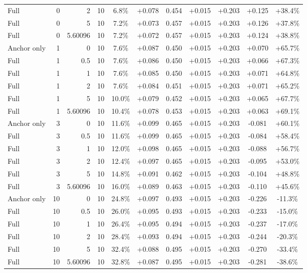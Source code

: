 \begin{table}[htbp]
\begin{tabular}{lrrrccccccc}
Full & 0 & 2 & 10 & 6.8\% & +0.078 & 0.454 & +0.015 & +0.203 & +0.125 & +38.4\% \\
Full & 0 & 5 & 10 & 7.2\% & +0.073 & 0.457 & +0.015 & +0.203 & +0.126 & +37.8\% \\
Full & 0 & 5.60096 & 10 & 7.2\% & +0.072 & 0.457 & +0.015 & +0.203 & +0.124 & +38.8\% \\
Anchor only & 1 & 0 & 10 & 7.6\% & +0.087 & 0.450 & +0.015 & +0.203 & +0.070 & +65.7\% \\
Full & 1 & 0.5 & 10 & 7.6\% & +0.086 & 0.450 & +0.015 & +0.203 & +0.066 & +67.3\% \\
Full & 1 & 1 & 10 & 7.6\% & +0.085 & 0.450 & +0.015 & +0.203 & +0.071 & +64.8\% \\
Full & 1 & 2 & 10 & 7.6\% & +0.084 & 0.451 & +0.015 & +0.203 & +0.071 & +65.2\% \\
Full & 1 & 5 & 10 & 10.0\% & +0.079 & 0.452 & +0.015 & +0.203 & +0.065 & +67.7\% \\
Full & 1 & 5.60096 & 10 & 10.4\% & +0.078 & 0.453 & +0.015 & +0.203 & +0.063 & +69.1\% \\
Anchor only & 3 & 0 & 10 & 11.6\% & +0.099 & 0.465 & +0.015 & +0.203 & -0.081 & +60.1\% \\
Full & 3 & 0.5 & 10 & 11.6\% & +0.099 & 0.465 & +0.015 & +0.203 & -0.084 & +58.4\% \\
Full & 3 & 1 & 10 & 12.0\% & +0.098 & 0.465 & +0.015 & +0.203 & -0.088 & +56.7\% \\
Full & 3 & 2 & 10 & 12.4\% & +0.097 & 0.465 & +0.015 & +0.203 & -0.095 & +53.0\% \\
Full & 3 & 5 & 10 & 14.8\% & +0.091 & 0.462 & +0.015 & +0.203 & -0.104 & +48.8\% \\
Full & 3 & 5.60096 & 10 & 16.0\% & +0.089 & 0.463 & +0.015 & +0.203 & -0.110 & +45.6\% \\
Anchor only & 10 & 0 & 10 & 24.8\% & +0.097 & 0.493 & +0.015 & +0.203 & -0.226 & -11.3\% \\
Full & 10 & 0.5 & 10 & 26.0\% & +0.095 & 0.493 & +0.015 & +0.203 & -0.233 & -15.0\% \\
Full & 10 & 1 & 10 & 26.4\% & +0.095 & 0.494 & +0.015 & +0.203 & -0.237 & -17.0\% \\
Full & 10 & 2 & 10 & 28.4\% & +0.093 & 0.494 & +0.015 & +0.203 & -0.244 & -20.3\% \\
Full & 10 & 5 & 10 & 32.4\% & +0.088 & 0.495 & +0.015 & +0.203 & -0.270 & -33.4\% \\
Full & 10 & 5.60096 & 10 & 32.8\% & +0.087 & 0.495 & +0.015 & +0.203 & -0.281 & -38.6\% \\

\end{tabular}
\end{table}
